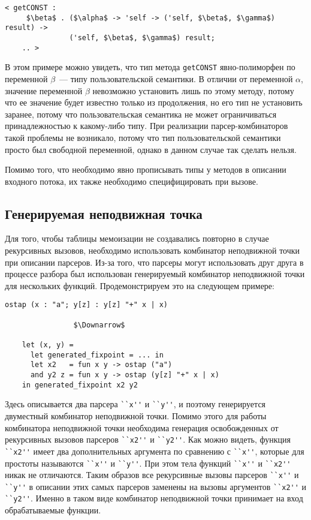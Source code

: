 \documentclass[conference]{IEEEtran}
\begin{document}
\begin{lstlisting}[basicstyle=\small]
  < getCONST :
     $\beta$ . ($\alpha$ -> 'self -> ('self, $\beta$, $\gamma$) result) ->
               ('self, $\beta$, $\gamma$) result;
    .. >
\end{lstlisting}

В этом примере можно увидеть, что тип метода \lstinline|getCONST| явно-полиморфен по переменной $\beta$~--- типу пользовательской семантики. В отличии от переменной $\alpha$,
значение переменной $\beta$ невозможно установить лишь по этому методу, потому что ее значение будет известно только из продолжения, но его тип не установить заранее,
потому что пользовательская семантика не может ограничиваться принадлежностью к какому-либо типу. При реализации парсер-комбинаторов такой проблемы не возникало,
потому что тип пользовательской семантики просто был свободной переменной, однако в данном случае так сделать нельзя.

Помимо того, что необходимо явно прописывать типы у методов в описании входного потока, их также необходимо специфицировать при вызове.

\subsection{Генерируемая неподвижная точка}

Для того, чтобы таблицы мемоизации не создавались повторно в случае рекурсивных вызовов, необходимо использовать комбинатор неподвижной точки при описании парсеров.
Из-за того, что парсеры могут использовать друг друга в процессе разбора был использован генерируемый комбинатор неподвижной точки для нескольких функций. Продемонстрируем
это на следующем примере:

\begin{lstlisting}[basicstyle=\small]
    ostap (x : "a"; y[z] : y[z] "+" x | x)

                $\Downarrow$

    let (x, y) =
      let generated_fixpoint = ... in
      let x2   = fun x y -> ostap ("a")
      and y2 z = fun x y -> ostap (y[z] "+" x | x)
    in generated_fixpoint x2 y2
\end{lstlisting}

Здесь описывается два парсера \lstinline|``x''| и \lstinline|``y''|, и поэтому генерируется двуместный комбинатор неподвижной точки. Помимо этого для работы комбинатора неподвижной
точки необходима генерация освобожденных от рекурсивных вызовов парсеров \lstinline|``x2''| и \lstinline|``y2''|. Как можно видеть, функция \lstinline|``x2''| имеет два дополнительных
аргумента по сравнению с \lstinline|``x''|, которые для простоты называются \lstinline|``x''| и \lstinline|``y''|. При этом тела функций \lstinline|``x''| и \lstinline|``x2''| никак не отличаются.
Таким образов все рекурсивные вызовы парсеров \lstinline|``x''| и \lstinline|``y''| в описании этих самых парсеров заменены на вызовы аргументов \lstinline|``x2''| и  \lstinline|``y2''|.
Именно в таком виде комбинатор неподвижной точки принимает на вход обрабатываемые функции.
\end{document}

